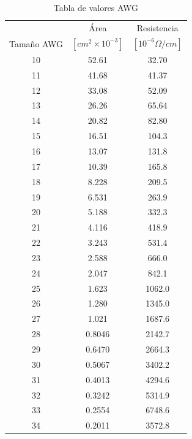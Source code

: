 \begin{table}[H]
    \centering
    \begin{tabular}{ccc}
        \hline
                   & Área                  & Resistencia          \\ \cline{2-3} 
        Tamaño AWG & $[cm^2\times10^{-3}]$ & $[10^{-6}\Omega/cm]$ \\ \hline
        10         & 52.61                 & 32.70                \\
        11         & 41.68                 & 41.37                \\
        12         & 33.08                 & 52.09                \\
        13         & 26.26                 & 65.64                \\
        14         & 20.82                 & 82.80                \\
        15         & 16.51                 & 104.3                \\
        16         & 13.07                 & 131.8                \\
        17         & 10.39                 & 165.8                \\
        18         & 8.228                 & 209.5                \\
        19         & 6.531                 & 263.9                \\
        20         & 5.188                 & 332.3                \\
        21         & 4.116                 & 418.9                \\
        22         & 3.243                 & 531.4                \\
        23         & 2.588                 & 666.0                \\
        24         & 2.047                 & 842.1                \\
        25         & 1.623                 & 1062.0               \\
        26         & 1.280                 & 1345.0               \\
        27         & 1.021                 & 1687.6               \\
        28         & 0.8046                & 2142.7               \\
        29         & 0.6470                & 2664.3               \\
        30         & 0.5067                & 3402.2               \\
        31         & 0.4013                & 4294.6               \\
        32         & 0.3242                & 5314.9               \\
        33         & 0.2554                & 6748.6               \\
        34         & 0.2011                & 3572.8               \\ \hline
        \end{tabular}
    \caption{Tabla de valores AWG}
    \label{table:awg}
\end{table}

